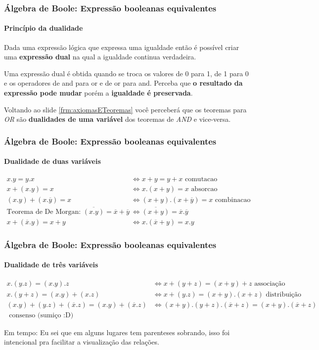 \begin{frame}
	\frametitle{Álgebra de Boole: Expressão booleanas equivalentes}
	\framesubtitle{Princípio da dualidade}
	\par Dada uma expressão lógica que expressa uma igualdade então é possível criar uma \textbf{expressão dual} na qual a igualdade continua verdadeira.\newline
	
	\par Uma expressão dual é obtida quando se troca os valores de 0 para 1, de 1 para 0 e os operadores de and para or e de or para and. Perceba que \textbf{o resultado da expressão pode mudar} porém a \textbf{igualdade é preservada}.\newline
	
	\par Voltando ao slide \ref{frm:axiomasETeoremas} você perceberá que os teoremas para \textit{OR} são \textbf{dualidades de uma variável} dos teoremas de \textit{AND} e vice-versa.
		
\end{frame}

\begin{frame}
	\frametitle{Álgebra de Boole: Expressão booleanas equivalentes}
	\framesubtitle{Dualidade de duas variáveis}
	\begin{equation}
		\begin{aligned}
			x.y=y.x &\Leftrightarrow x+y=y+x \text{ comutacao}\\
			x+(x.y)=x &\Leftrightarrow x.(x+y) = x \text{ absorcao}\\
			(x.y)+(x.\overline{y})=x &\Leftrightarrow (x+y).(x+\overline{y})=x \text{ combinacao}\\
			\boxed{\text{Teorema de De Morgan: } \overline{(x.y)}=\overline{x}+\overline{y}} &\Leftrightarrow \overline{(x+y)}=\overline{x}.\overline{y}\\
			x+(\overline{x}.y)=x+y &\Leftrightarrow x.(\overline{x}+y)=x.y
		\end{aligned}
	\end{equation}
\end{frame}

\begin{frame}
	\frametitle{Álgebra de Boole: Expressão booleanas equivalentes}
	\framesubtitle{Dualidade de três variáveis}
	\begin{equation}
		\begin{aligned}
			x.(y.z)=(x.y).z &\Leftrightarrow x+(y+z)=(x+y)+z \text{ associação} \\
			x.(y+z)=(x.y)+(x.z) &\Leftrightarrow x+(y.z)=(x+y).(x+z) \text{ distribuição}\\
			(x.y)+(y.z)+(\overline{x}.z)=(x.y)+(\overline{x}.z) &\Leftrightarrow (x+y).(y+z).(\overline{x}+z) = (x+y).(\overline{x}+z) \\ \text{ consenso (sumiço :D)}
		\end{aligned}
	\end{equation}
	\par Em tempo: Eu sei que em alguns lugares tem parenteses sobrando, isso foi intencional pra facilitar a visualização das relações.
\end{frame}

